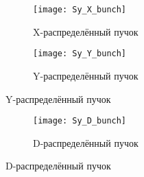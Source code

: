 \documentclass{article}
\begin{document}
\begin{figure}[ht]
  \centering
  \begin{subfigure}{\textwidth}
    \centering
    \texttt{[image: Sy\_X\_bunch]}
    \caption{X-распределённый пучок}
  \end{subfigure}
  \begin{subfigure}{\textwidth}
    \centering
    \texttt{[image: Sy\_Y\_bunch]}
    \caption{Y-распределённый пучок}
  \end{subfigure}
\end{figure}
\begin{figure}[ht]\ContinuedFloat
  \centering
  \begin{subfigure}{\textwidth}
    \centering
    \texttt{[image: Sy\_D\_bunch]}
    \caption{D-распределённый пучок}
  \end{subfigure}
\end{figure}
\end{document}
